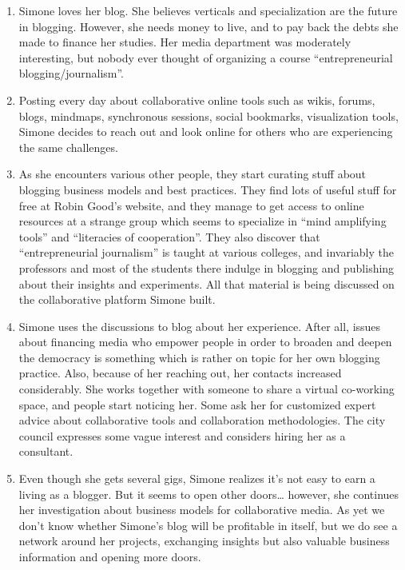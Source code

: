 \begin{enumerate}
\item
  Simone loves her blog. She believes verticals and specialization are
  the future in blogging. However, she needs money to live, and to pay
  back the debts she made to finance her studies. Her media department
  was moderately interesting, but nobody ever thought of organizing a
  course ``entrepreneurial blogging/journalism''.
\item
  Posting every day about collaborative online tools such as wikis,
  forums, blogs, mindmaps, synchronous sessions, social bookmarks,
  visualization tools, Simone decides to reach out and look online for
  others who are experiencing the same challenges.
\item
  As she encounters various other people, they start curating stuff
  about blogging business models and best practices. They find lots of
  useful stuff for free at Robin Good's website, and they manage to get
  access to online resources at a strange group which seems to
  specialize in ``mind amplifying tools'' and ``literacies of
  cooperation''. They also discover that ``entrepreneurial journalism''
  is taught at various colleges, and invariably the professors and most
  of the students there indulge in blogging and publishing about their
  insights and experiments. All that material is being discussed on the
  collaborative platform Simone built.
\item
  Simone uses the discussions to blog about her experience. After all,
  issues about financing media who empower people in order to broaden
  and deepen the democracy is something which is rather on topic for her
  own blogging practice. Also, because of her reaching out, her contacts
  increased considerably. She works together with someone to share a
  virtual co-working space, and people start noticing her. Some ask her
  for customized expert advice about collaborative tools and
  collaboration methodologies. The city council expresses some vague
  interest and considers hiring her as a consultant.
\item
  Even though she gets several gigs, Simone realizes it's not easy to
  earn a living as a blogger. But it seems to open other doors\ldots{}
  however, she continues her investigation about business models for
  collaborative media. As yet we don't know whether Simone's blog will
  be profitable in itself, but we do see a network around her projects,
  exchanging insights but also valuable business information and opening
  more doors.
\end{enumerate}

